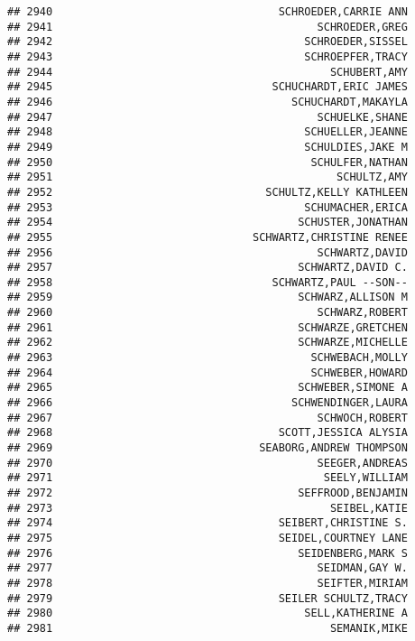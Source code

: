 \documentclass[
]{article}
\begin{document}
\begin{verbatim}
## 2940                                   SCHROEDER,CARRIE ANN
## 2941                                         SCHROEDER,GREG
## 2942                                       SCHROEDER,SISSEL
## 2943                                       SCHROEPFER,TRACY
## 2944                                           SCHUBERT,AMY
## 2945                                  SCHUCHARDT,ERIC JAMES
## 2946                                     SCHUCHARDT,MAKAYLA
## 2947                                         SCHUELKE,SHANE
## 2948                                       SCHUELLER,JEANNE
## 2949                                       SCHULDIES,JAKE M
## 2950                                        SCHULFER,NATHAN
## 2951                                            SCHULTZ,AMY
## 2952                                 SCHULTZ,KELLY KATHLEEN
## 2953                                       SCHUMACHER,ERICA
## 2954                                      SCHUSTER,JONATHAN
## 2955                               SCHWARTZ,CHRISTINE RENEE
## 2956                                         SCHWARTZ,DAVID
## 2957                                      SCHWARTZ,DAVID C.
## 2958                                  SCHWARTZ,PAUL --SON--
## 2959                                      SCHWARZ,ALLISON M
## 2960                                         SCHWARZ,ROBERT
## 2961                                      SCHWARZE,GRETCHEN
## 2962                                      SCHWARZE,MICHELLE
## 2963                                        SCHWEBACH,MOLLY
## 2964                                        SCHWEBER,HOWARD
## 2965                                      SCHWEBER,SIMONE A
## 2966                                     SCHWENDINGER,LAURA
## 2967                                         SCHWOCH,ROBERT
## 2968                                   SCOTT,JESSICA ALYSIA
## 2969                                SEABORG,ANDREW THOMPSON
## 2970                                         SEEGER,ANDREAS
## 2971                                          SEELY,WILLIAM
## 2972                                      SEFFROOD,BENJAMIN
## 2973                                           SEIBEL,KATIE
## 2974                                   SEIBERT,CHRISTINE S.
## 2975                                   SEIDEL,COURTNEY LANE
## 2976                                      SEIDENBERG,MARK S
## 2977                                         SEIDMAN,GAY W.
## 2978                                         SEIFTER,MIRIAM
## 2979                                   SEILER SCHULTZ,TRACY
## 2980                                       SELL,KATHERINE A
## 2981                                           SEMANIK,MIKE

\end{verbatim}
\end{document}
